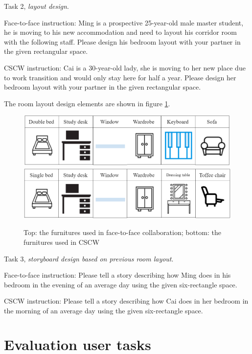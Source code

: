 \documentclass[12pt,twoside]{article}
\begin{document}
Task 2, \textit{layout design}.

Face-to-face instruction: Ming is a prospective 25-year-old male master student, he is moving to his new accommodation and need to layout his corridor room with the following staff. Please design his bedroom layout with your partner in the given rectangular space.

CSCW instruction: Cai is a 30-year-old lady, she is moving to her new place due to work transition and would only stay here for half a year. Please design her bedroom layout with your partner in the given rectangular space.

The room layout design elements are shown in figure \ref{fig:field_task2}. \\

\begin{figure}[h!]
\centering
\includegraphics[scale=1]{img/user_task2_f2f.PNG}\\
\includegraphics[scale=1]{img/user_task2_CSCW.PNG}
\caption{Top: the furnitures used in face-to-face collaboration; bottom: the furnitures used in CSCW}
\label{fig:field_task2}
\end{figure}

Task 3, \textit{storyboard design based on previous room layout}.

Face-to-face instruction: Please tell a story describing how Ming does in his bedroom in the evening of an average day using the given six-rectangle space.

CSCW instruction: Please tell a story describing how Cai does in her bedroom in the morning of an average day using the given six-rectangle space.


\section{Evaluation user tasks}
\label{appdx:evaluationtask}
\end{document}
